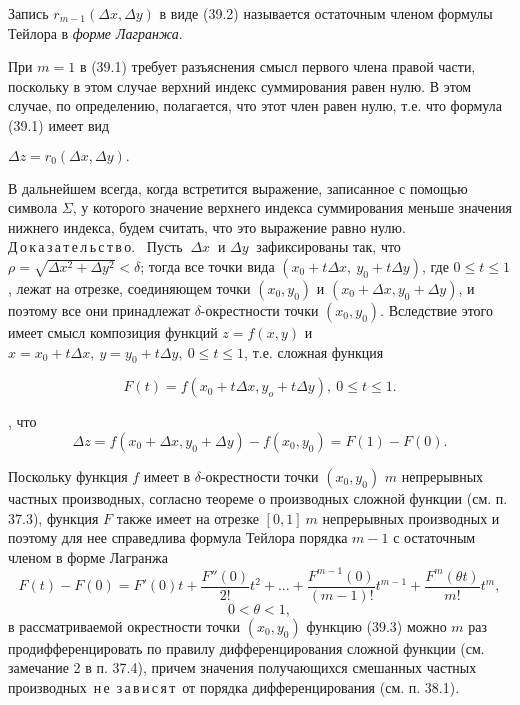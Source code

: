 \documentclass[a4paper]{article}
\begin{document}
Запись $r_{m-1}(\Delta x,\Delta y)$ в виде (39.2) называется остаточным членом формулы Тейлора в \textit{форме Лагранжа}.

При $m = 1$ в (39.1) требует разъяснения смысл первого члена правой части, поскольку в этом случае верхний индекс суммирования равен нулю. В этом случае, по определению, полагается, что этот член равен нулю, т.е. что формула (39.1) имеет вид
\begin{center}
    $\Delta z = r_0(\Delta x, \Delta y).$
\end{center}

В дальнейшем всегда, когда встретится выражение, записанное с помощью символа $\Sigma$, у которого значение верхнего индекса суммирования меньше значения нижнего индекса, будем считать, что это выражение равно нулю.\\
\noindent\textsf{\large{Д\,о\,к\,а\,з\,а\,т\,е\,л\,ь\,с\,т\,в\,о.\ }} Пусть $\ \Delta x\ $ и $\Delta y\ $ зафиксированы так, что\ $\rho = \sqrt{\Delta x^2 + \Delta y^2} < \delta$;
тогда все точки вида $(x_0 + t\Delta x,\ y_0 + t\Delta y)$, где $0 \leqslant t \leqslant 1$, лежат на отрезке, соединяющем точки $(x_0, y_0)$ и $(x_0 + \Delta x, y_0 + \Delta y)$, и поэтому все они принадлежат $\delta$-окрестности точки $(x_0, y_0)$. Вследствие этого имеет смысл композиция функций $z = f(x,y)$ и $x = x_0 +t\Delta x,\ y = y_0 + t\Delta y,\ 0 \leqslant t \leqslant 1$, т.е. сложная функция

\[F(t) = f(x_0 + t\Delta x, y_o + t\Delta y),\ 0 \leqslant t \leqslant 1. \tag{39.3}\]

, что
\[\Delta z = f(x_0 + \Delta x, y_0 + \Delta y) - f(x_0, y_0) = F(1) - F(0).\tag{39.4}\]

Поскольку функция $f$ имеет в $\delta$-окрестности точки $(x_0, y_0)$ $m$ непрерывных частных производных, согласно теореме о производных сложной функции (см. п. 37.3), функция $F$ также имеет на отрезке $[0,1]\ m$ непрерывных производных и поэтому для нее справедлива формула Тейлора порядка $m-1$ с остаточным членом в форме Лагранжа
\[F(t) - F(0) = F'(0)t + \frac{F''(0)}{2!}t^2 + ... + \frac{F^{m-1}(0)}{(m-1)!}t^{m-1} + \frac{F^{m}(\theta t)}{m!}t^{m},\]
\[0 < \theta < 1,\tag{39.5}\]
 в рассматриваемой окрестности точки $(x_0, y_0)$ функцию (39.3) можно $m$ раз продифференцировать по правилу дифференцирования сложной функции (см. замечание 2 в п. 37.4), причем значения получающихся смешанных частных производных \textsf{\,н\,е\,  з\,а\,в\,и\,с\,я\,т\,} от порядка дифференцирования (см. п. 38.1).
\end{document}
